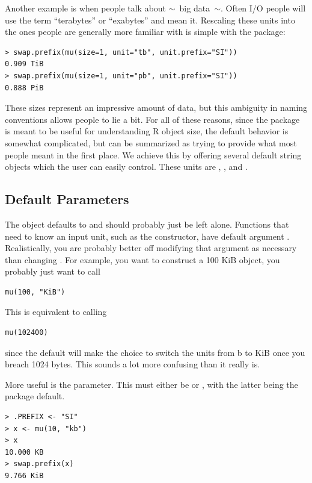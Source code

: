 Another example is when people talk about $\sim$~\hspace{-.1cm}big data\hspace{-.1cm}~$\sim$.  Often I/O people will use the term ``terabytes'' or ``exabytes'' and mean it.  Rescaling these units into the ones people are generally more familiar with is simple with the  package:
\begin{lstlisting}[language=rr]
> swap.prefix(mu(size=1, unit="tb", unit.prefix="SI"))
0.909 TiB
> swap.prefix(mu(size=1, unit="pb", unit.prefix="SI"))
0.888 PiB
\end{lstlisting}

These sizes represent an impressive amount of data, but this ambiguity in naming conventions allows people to lie a bit.  For all of these reasons, since the package is meant to be useful for understanding R object size, the default behavior is somewhat complicated, but can be summarized as trying to provide what most people meant in the first place.  We achieve this by offering several default string objects which the user can easily control.  These units are , , and .  



\subsection{Default Parameters}

The  object defaults to  and should probably just be left alone.  Functions that need to know an input unit, such as the constructor, have default argument .  Realistically, you are probably better off modifying that argument as necessary than changing .  For example, you want to construct a 100 KiB  object, you probably just want to call
\begin{lstlisting}[language=rr]
mu(100, "KiB")
\end{lstlisting}
This is equivalent to calling
\begin{lstlisting}[language=rr]
mu(102400)
\end{lstlisting}
since the default  will make the choice to switch the units from b to KiB once you breach 1024 bytes.  This sounds a lot more confusing than it really is.

More useful is the  parameter.  This must either be  or , with the latter being the package default.  
\begin{lstlisting}[language=rr]
> .PREFIX <- "SI"
> x <- mu(10, "kb")
> x
10.000 KB
> swap.prefix(x)
9.766 KiB
\end{lstlisting}



